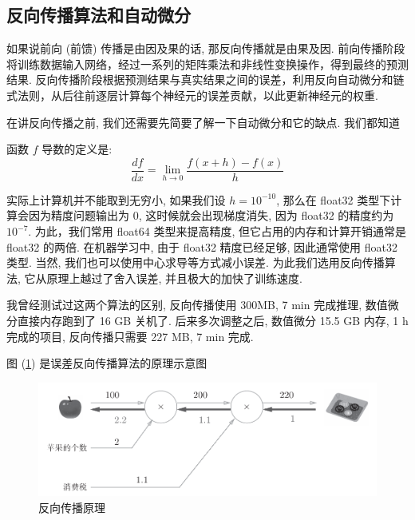 \documentclass[lang=cn,a4paper,newtx]{elegantpaper}
\begin{document}
\subsection{反向传播算法和自动微分}
如果说前向 (前馈) 传播是由因及果的话, 那反向传播就是由果及因. 前向传播阶段将训练数据输入网络，经过一系列的矩阵乘法和非线性变换操作，得到最终的预测结果. 反向传播阶段根据预测结果与真实结果之间的误差，利用反向自动微分和链式法则，从后往前逐层计算每个神经元的误差贡献，以此更新神经元的权重. 

在讲反向传播之前, 我们还需要先简要了解一下自动微分和它的缺点. 我们都知道 
\begin{definition}函数 $ f $ 导数的定义是: 
    \begin{equation}
        \frac{d f}{d x} = \lim_{h \to 0} \frac{ f(x + h) - f(x) }{h} 
    \end{equation}
\end{definition}

实际上计算机并不能取到无穷小, 如果我们设 $h = 10^{-10}$, 那么在 float32 类型下计算会因为精度问题输出为 0, 这时候就会出现梯度消失, 因为 float32 的精度约为 $10^{-7}$. 为此，我们常用 float64 类型来提高精度, 但它占用的内存和计算开销通常是 float32 的两倍. 在机器学习中, 由于 float32 精度已经足够, 因此通常使用 float32 类型. 当然, 我们也可以使用中心求导等方式减小误差. 为此我们选用反向传播算法, 它从原理上越过了舍入误差, 并且极大的加快了训练速度. 
\begin{remark}
    我曾经测试过这两个算法的区别, 反向传播使用 300MB, 7 min 完成推理, 数值微分直接内存跑到了 16 GB 关机了. 后来多次调整之后, 数值微分 15.5 GB 内存, 1 h 完成的项目, 反向传播只需要 227 MB, 7 min 完成.
\end{remark}

图 (\ref{fig:BP-theory}) 是误差反向传播算法的原理示意图
\begin{figure}[htbp]
    \centering
    \includegraphics{images/bp-theory.png}
    \caption{反向传播原理}\label{fig:BP-theory}
\end{figure}
\end{document}
